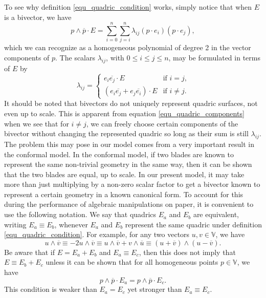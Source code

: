 \documentclass{birkjour}
\theoremstyle{definition}
\theoremstyle{remark}
\numberwithin{equation}{section}
\newcommand{\V}{\mathbb{V}}
\begin{document}
To see why definition \eqref{equ_quadric_condition} works, simply notice that when $E$ is a bivector, we have
\begin{equation}\label{equ_homogeneous_polynomial}
p\wedge\overline{p}\cdot E=\sum_{i=0}^n\sum_{j=i}^n \lambda_{ij}(p\cdot e_i)(p\cdot e_j),
\end{equation}
which we can recognize as a homogeneous polynomial of degree 2 in the vector components of $p$.
The scalars $\lambda_{ij}$, with $0\leq i\leq j\leq n$, may be formulated in terms of $E$ by
\begin{equation}\label{equ_quadric_components}
\lambda_{ij} = \left\{\begin{array}{ll}
e_i\overline{e_j}\cdot E & \mbox{if $i=j$,} \\
\left(e_i\overline{e_j}+e_j\overline{e_i}\right)\cdot E & \mbox{if $i\neq j$.}
\end{array}\right.
\end{equation}
It should be noted that bivectors do not uniquely represent quadric surfaces, not even up to scale.
This is apparent from equation \eqref{equ_quadric_components} when we see that for $i\neq j$,
we can freely choose certain components of the bivector without changing the represented
quadric so long as their sum is still $\lambda_{ij}$.  The problem this may pose in our model
comes from a very important result in the conformal model.  In the conformal model, if
two blades are known to represent the same non-trivial geometry in the same way,
then it can be shown that the two blades are equal, up to scale.
In our present model, it may take more than just
multiplying by a non-zero scalar factor to get a bivector known to represent a certain geometry in a
known canonical form.  To account for this during the performance of algebraic manipulations on paper,
it is convenient to use the following notation.  We say that quadrics $E_a$ and $E_b$ are
equivalent, writing $E_a\equiv E_b$, whenever $E_a$ and $E_b$ represent the same quadric
under definition \eqref{equ_quadric_condition}.  For example, for any two vectors $u,v\in\V$, we have
\begin{equation}
u\wedge\overline{v}\equiv -2u\wedge\overline{v}\equiv u\wedge\overline{v}+v\wedge\overline{u}
\equiv(u+\overline{v})\wedge(u-\overline{v}).
\end{equation}
Be aware that if $E=E_a+E_b$ and $E_a\equiv E_c$, then this does not imply that $E\equiv E_b+E_c$
unless it can be shown that for all homogeneous points $p\in\V$, we have
\begin{equation}
p\wedge\overline{p}\cdot E_a=p\wedge\overline{p}\cdot E_c.
\end{equation}
This condition is weaker than $E_a=E_c$ yet stronger than $E_a\equiv E_c$.
\end{document}
